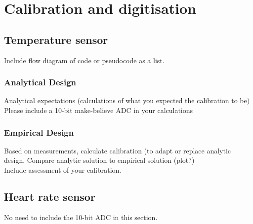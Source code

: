 \chapter{Calibration and digitisation}\label{ch:ADC}

\section{Temperature sensor} \label{sec:ADCTemp}
Include flow diagram of code or pseudocode as a list.
\subsection{Analytical Design} \label{sec:ADCTempAna}
Analytical expectations (calculations of what you expected the calibration to be)
Please include a 10-bit make-believe ADC in your calculations
\subsection{Empirical Design} \label{sec:ADCTempEmp}
Based on measurements, calculate calibration (to adapt or replace analytic design. 
Compare analytic solution to empirical solution (plot?)\\
Include assessment of your calibration. 


\section{Heart rate sensor} \label{sec:ADCHeart}
No need to include the 10-bit ADC in this section. 


